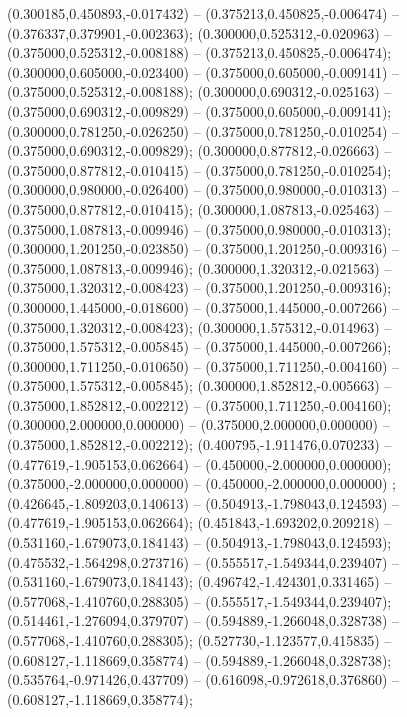  (0.300185,0.450893,-0.017432) -- (0.375213,0.450825,-0.006474) -- (0.376337,0.379901,-0.002363);
 (0.300000,0.525312,-0.020963) -- (0.375000,0.525312,-0.008188) -- (0.375213,0.450825,-0.006474);
 (0.300000,0.605000,-0.023400) -- (0.375000,0.605000,-0.009141) -- (0.375000,0.525312,-0.008188);
 (0.300000,0.690312,-0.025163) -- (0.375000,0.690312,-0.009829) -- (0.375000,0.605000,-0.009141);
 (0.300000,0.781250,-0.026250) -- (0.375000,0.781250,-0.010254) -- (0.375000,0.690312,-0.009829);
 (0.300000,0.877812,-0.026663) -- (0.375000,0.877812,-0.010415) -- (0.375000,0.781250,-0.010254);
 (0.300000,0.980000,-0.026400) -- (0.375000,0.980000,-0.010313) -- (0.375000,0.877812,-0.010415);
 (0.300000,1.087813,-0.025463) -- (0.375000,1.087813,-0.009946) -- (0.375000,0.980000,-0.010313);
 (0.300000,1.201250,-0.023850) -- (0.375000,1.201250,-0.009316) -- (0.375000,1.087813,-0.009946);
 (0.300000,1.320312,-0.021563) -- (0.375000,1.320312,-0.008423) -- (0.375000,1.201250,-0.009316);
 (0.300000,1.445000,-0.018600) -- (0.375000,1.445000,-0.007266) -- (0.375000,1.320312,-0.008423);
 (0.300000,1.575312,-0.014963) -- (0.375000,1.575312,-0.005845) -- (0.375000,1.445000,-0.007266);
 (0.300000,1.711250,-0.010650) -- (0.375000,1.711250,-0.004160) -- (0.375000,1.575312,-0.005845);
 (0.300000,1.852812,-0.005663) -- (0.375000,1.852812,-0.002212) -- (0.375000,1.711250,-0.004160);
 (0.300000,2.000000,0.000000) -- (0.375000,2.000000,0.000000) -- (0.375000,1.852812,-0.002212);
 (0.400795,-1.911476,0.070233) -- (0.477619,-1.905153,0.062664) -- (0.450000,-2.000000,0.000000);
 (0.375000,-2.000000,0.000000) -- (0.450000,-2.000000,0.000000) ;
 (0.426645,-1.809203,0.140613) -- (0.504913,-1.798043,0.124593) -- (0.477619,-1.905153,0.062664);
 (0.451843,-1.693202,0.209218) -- (0.531160,-1.679073,0.184143) -- (0.504913,-1.798043,0.124593);
 (0.475532,-1.564298,0.273716) -- (0.555517,-1.549344,0.239407) -- (0.531160,-1.679073,0.184143);
 (0.496742,-1.424301,0.331465) -- (0.577068,-1.410760,0.288305) -- (0.555517,-1.549344,0.239407);
 (0.514461,-1.276094,0.379707) -- (0.594889,-1.266048,0.328738) -- (0.577068,-1.410760,0.288305);
 (0.527730,-1.123577,0.415835) -- (0.608127,-1.118669,0.358774) -- (0.594889,-1.266048,0.328738);
 (0.535764,-0.971426,0.437709) -- (0.616098,-0.972618,0.376860) -- (0.608127,-1.118669,0.358774);
